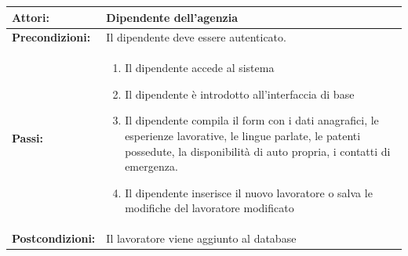 \documentclass[a4paper, oneside, 12pt]{article}
\begin{document}
\begin{tabular}{ | l | p{11cm} | } 
	\hline
	\textbf{Attori:} & Dipendente dell'agenzia  \\ 
	\hline
	\textbf{Precondizioni:} & Il dipendente deve essere autenticato. \\
	\hline
	\textbf{Passi:} &
		\begin{enumerate}
			\item Il dipendente accede al sistema
			\item Il dipendente è introdotto all'interfaccia di base
			\item Il dipendente compila il form con i dati anagrafici, le esperienze lavorative, le lingue parlate, le patenti possedute, la disponibilità
			di auto propria, i contatti di emergenza.
			\item Il dipendente inserisce il nuovo lavoratore o salva le modifiche del lavoratore modificato
		\end{enumerate} \\
	\hline
	\textbf{Postcondizioni:} &  Il lavoratore viene aggiunto al database \\
	\hline
  \end{tabular}

\end{document}
